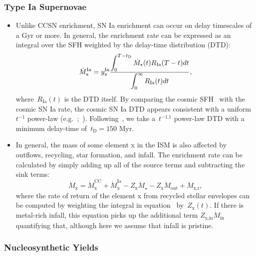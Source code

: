 \documentclass[ms.tex]{subfiles}
\begin{document}
\subsubsection{Type Ia Supernovae}
\label{sec:methods:onezone:sneia}

\begin{itemize}

	\item Unlike CCSN enrichment, SN Ia enrichment can occur on delay
	timescales of a Gyr or more.
	In general, the enrichment rate can be expressed as an integral over the
	SFH weighted by the delay-time distribution (DTD):
	\begin{equation}
	\dot{M}_\text{x}^\text{Ia} = y_\text{x}^\text{Ia} \frac{\displaystyle{
		\int_0^{T - t_\text{D}} \dot{M}_\star(t) R_\text{Ia}(T - t) dt
	}}{\displaystyle{
		\int_0^\infty R_\text{Ia}(t) dt
	}},
	\end{equation}
	where~$R_\text{Ia}(t)$ is the DTD itself.
	By comparing the cosmic SFH~\citep[e.g.][]{Madau2014} with the cosmic SN
	Ia rate, the cosmic SN Ia DTD appears consistent with a uniform~$t^{-1}$
	power-law (e.g.~\citealp{Maoz2012a};~\citealp*{Maoz2012b, Graur2013}).
	Following~\citet{Weinberg2017}, we take a~$t^{-1.1}$ power-law DTD with a
	minimum delay-time of~$t_\text{D} = 150$ Myr.

	\item In general, the mass of some element x in the ISM is also affected by
	outflows, recycling, star formation, and infall.
	The enrichment rate can be calculated by simply adding up all of the source
	terms and subtracting the sink terms:
	\begin{equation}
	\label{eq:enrichment_eq}
	\dot{M}_\text{x} = \dot{M}_\text{x}^\text{CC} + \dot{M}_\text{x}^\text{Ia}
	- Z_\text{x}\dot{M}_\star - Z_\text{x}\dot{M}_\text{out} +
	\dot{M}_\text{x,r},
	\end{equation}
	where the rate of return of the element x from recycled stellar envelopes
	can be computed by weighting the integral in equation~
	by~$Z_\text{x}(t)$.
	If there is metal-rich infall, this equation picks up the additional term
	$Z_\text{x,in}\dot{M}_\text{in}$ quantifying that, although here we assume
	that infall is pristine.

\end{itemize}

\subsubsection{Nucleosynthetic Yields}
\label{sec:methods:onezone:yields}
\end{document}
